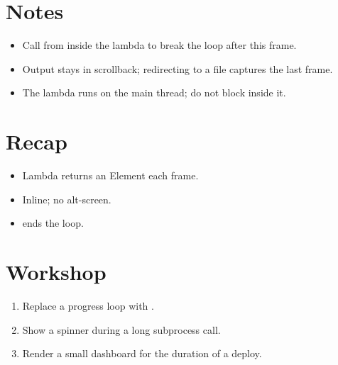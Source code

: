 \section{Notes}

\begin{itemize}[leftmargin=*]
  \item Call  from inside the lambda to break
    the loop after this frame.
  \item Output stays in scrollback; redirecting to a file
    captures the last frame.
  \item The lambda runs on the main thread; do not block
    inside it.
\end{itemize}

\section{Recap}

\begin{recap}
\begin{itemize}[leftmargin=*]
  \item Lambda returns an Element each frame.
  \item Inline; no alt-screen.
  \item {} ends the loop.
\end{itemize}
\end{recap}

\section*{Workshop}

\begin{enumerate}[leftmargin=*]
  \item Replace a  progress loop
    with .
  \item Show a spinner during a long subprocess call.
  \item Render a small dashboard for the duration of a
    deploy.
\end{enumerate}
